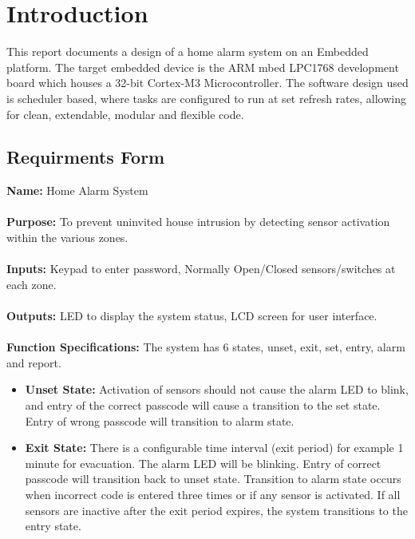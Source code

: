 \documentclass[aps, secnumarabic, balancelastpage, asmath, amssymb, nofootinbib, floatfix,]{revtex4-2}
\begin{document}
\section{\fontsize{11.3pt}{12pt}\selectfont \bf Introduction}
\fontsize{11pt}{12pt}\selectfont
\label{sec:1}

{
\setlength{\parindent}{0pt}

This report documents a design of a home alarm system on an Embedded platform. The target embedded device is the ARM mbed LPC1768 development board which houses a 32-bit Cortex-M3 Microcontroller. The software design used is scheduler based, where tasks are configured to run at set refresh rates, allowing for clean, extendable, modular and flexible code.

\subsection{\fontsize{11.4pt}{12pt}\selectfont \bf Requirments Form \label{sec:1.1}}
\setlength{\parindent}{0pt}
{
{\bf Name: }Home Alarm System
~\\
~\\
{\bf Purpose: }To prevent uninvited house intrusion by detecting sensor activation within the various zones.
~\\
~\\
{\bf Inputs: }Keypad to enter password, Normally Open/Closed sensors/switches at each zone.
~\\
~\\
{\bf Outputs: }LED to display the system status, LCD screen for user interface.
~\\
~\\
{\bf Function Specifications: }The system has 6 states, unset, exit, set, entry, alarm and report. 
\begin{itemize}
\item \textbf{Unset State: }Activation of sensors should not cause the alarm LED to blink, and entry of the correct passcode will cause a transition to the set state. Entry of wrong passcode will transition to alarm state.
\item \textbf{Exit State: }There is a configurable time interval (exit period) for example 1 minute for evacuation. The alarm LED will be blinking. Entry of correct passcode will transition back to unset state. Transition to alarm state occurs when incorrect code is entered three times or if any sensor is activated. If all sensors are inactive after the exit period expires, the system transitions to the entry state.

\end{itemize}}}
\end{document}
